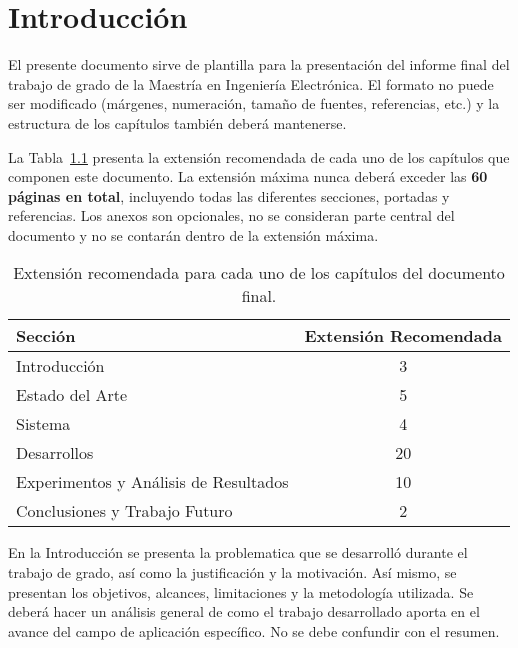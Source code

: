 \chapter{Introducción}\label{intro}

El presente documento sirve de plantilla para la presentación del informe final del trabajo de grado de la Maestría en Ingeniería Electrónica. El formato no puede ser modificado (márgenes, numeración, tamaño de fuentes, referencias, etc.) y la estructura de los capítulos también deberá mantenerse.

La Tabla~\ref{TablaExtension} presenta la extensión recomendada de cada uno de los capítulos que componen este documento. La extensión máxima nunca deberá exceder las \textbf{60 páginas en total}, incluyendo todas las diferentes secciones, portadas y referencias. Los anexos son opcionales, no se consideran parte central del documento y no se contarán dentro de la extensión máxima.

\begin{table}[ht]
\centering
\caption{Extensión recomendada para cada uno de los capítulos del documento final.}
 \begin{tabular}{| l | c |} 
 \hline
 \textbf{Sección} & \textbf{Extensión Recomendada} \\ 
 \hline\hline
 Introducción & 3 \\ 
 \hline
 Estado del Arte & 5 \\
 \hline
 Sistema & 4 \\
 \hline
 Desarrollos & 20 \\
 \hline
 Experimentos y Análisis de Resultados & 10 \\ 
 \hline
  Conclusiones y Trabajo Futuro & 2 \\ 
 \hline
\end{tabular}\label{TablaExtension}
\end{table}


\begin{tcolorbox}[width=\textwidth,colback={white},title={\textbf{Lineamientos del Capítulo Introducción}},colbacktitle=black,coltitle=white]    
En la Introducción se presenta la problematica que se desarrolló durante el trabajo de grado, así como la justificación y la motivación. Así mismo, se presentan los objetivos, alcances, limitaciones y la metodología utilizada. Se deberá hacer un análisis general de como el trabajo desarrollado aporta en el avance del campo de aplicación específico. No se debe confundir con el resumen.
\end{tcolorbox}    



